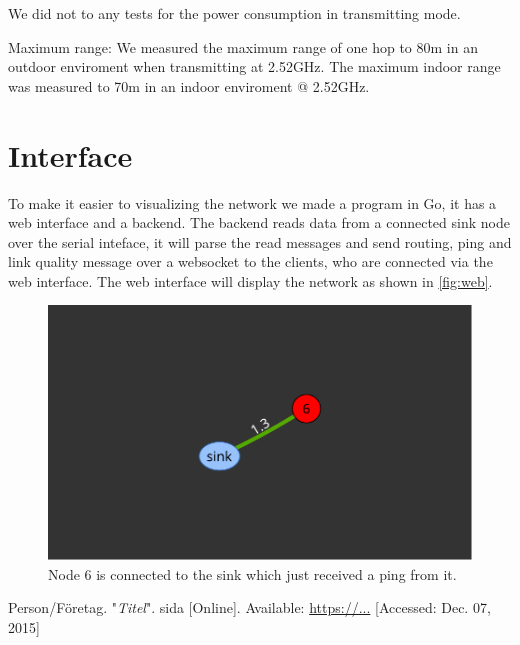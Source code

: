 \documentclass[a4paper,11pt]{article}
\begin{document}
We did not to any tests for the power consumption in transmitting
mode.

Maximum range:
We measured the maximum range of one hop to 80m in an outdoor 
enviroment when transmitting at 2.52GHz. 
The maximum indoor range was measured to 70m in an indoor
enviroment @ 2.52GHz.
 

\section{Interface}
To make it easier to visualizing the network we made a program in Go,
it has a web interface and a backend. The backend reads data from a
connected sink node over the serial inteface, it will parse the read
messages and send routing, ping and link quality message over a
websocket to the clients, who are connected via the web interface. The
web interface will display the network as shown in \autoref{fig:web}.

\begin{figure}[H]
  \begin{center}
    \includegraphics[width=.5\textwidth]{map}
  \end{center}
  \caption{Node 6 is connected to the sink which just received a ping from it.}
  \label{fig:web}
\end{figure}

\begin{thebibliography}{2}

  Person/Företag. "\emph{Titel}". sida [Online]. Available: \url{https://...} [Accessed: Dec. 07, 2015]

\end{thebibliography}
\end{document}
